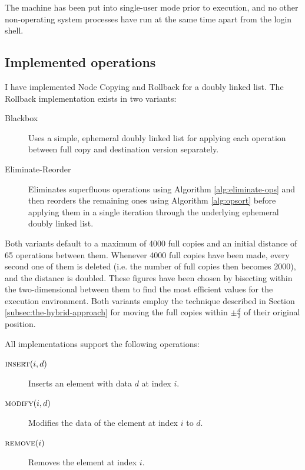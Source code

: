 The machine has been put into single-user mode prior to execution, and no other
non-operating system processes have run at the same time apart from the login
shell.

\subsection{Implemented operations}

I have implemented Node Copying and Rollback for a doubly linked list. The
Rollback implementation exists in two variants:

\begin{description}

  \item[Blackbox] Uses a simple, ephemeral doubly linked list for applying each
   operation between full copy and destination version separately.

  \item[Eliminate-Reorder] Eliminates superfluous operations using Algorithm
  \ref{alg:eliminate-ops} and then reorders the remaining ones using Algorithm
  \ref{alg:opsort} before applying them in a single iteration through the
  underlying ephemeral doubly linked list.

\end{description}

Both variants default to a maximum of 4000 full copies and an initial distance
of 65 operations between them. Whenever 4000 full copies have been made, every
second one of them is deleted (i.e. the number of full copies then becomes
2000), and the distance is doubled. These figures have been chosen by bisecting
within the two-dimensional between them to find the most efficient values for
the execution environment. Both variants employ the technique described in
Section \ref{subsec:the-hybrid-approach} for moving the full copies within
$\pm\frac{d}{2}$ of their original position.

All implementations support the following operations:

\begin{description}

  \item[$\textsc{insert}(i,d)$] Inserts an element with data $d$ at index $i$.

  \item[$\textsc{modify}(i,d)$] Modifies the data of the element at index $i$ to
  $d$.

  \item[$\textsc{remove}(i)$] Removes the element at index $i$.

\end{description}

